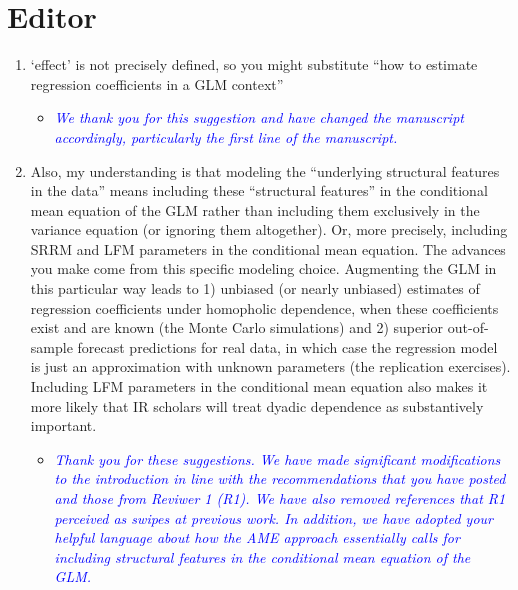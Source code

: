 \section*{Editor}

\begin{enumerate}
	\item `effect' is not precisely defined, so you might substitute ``how to estimate regression coefficients in a GLM context''
	\begin{itemize}
		\item \textcolor{blue}{ \emph{
		We thank you for this suggestion and have changed the manuscript accordingly, particularly the first line of the manuscript.}}
	\end{itemize}
	\item Also, my understanding is that modeling the ``underlying structural features in the data'' means including these ``structural features'' in the conditional mean equation of the GLM rather than including them exclusively in the variance equation (or ignoring them altogether). Or, more precisely, including SRRM and LFM parameters in the conditional mean equation. The advances you make come from this specific modeling choice. Augmenting the GLM in this particular way leads to 1) unbiased (or nearly unbiased) estimates of regression coefficients under homopholic dependence, when these coefficients exist and are known (the Monte Carlo simulations) and 2) superior out-of-sample forecast predictions for real data, in which case the regression model is just an approximation with unknown parameters (the replication exercises). Including LFM parameters in the conditional mean equation also makes it more likely that IR scholars will treat dyadic dependence as substantively important.
	\begin{itemize}
		\item \textcolor{blue}{ \emph{
			Thank you for these suggestions. We have made significant modifications to the introduction in line with the recommendations that you have posted and those from Reviwer 1 (R1). We have also removed references that R1 perceived as swipes at previous work. In addition, we have adopted your helpful language about how the AME approach essentially calls for including structural features in the conditional mean equation of the GLM.
			}}
	\end{itemize}
\end{enumerate}
